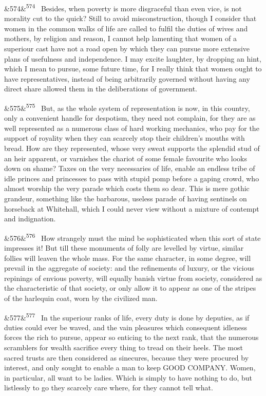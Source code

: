 \documentclass[12pt]{article}
\newcommand{\para}[1][]{\par\noindent\ifx&#1&\else\textsuperscript{\footnotesize #1}~\fi}
\begin{document}
\para[574] Besides, when poverty is more disgraceful than even vice, is not morality cut to the quick? Still to avoid misconstruction, though I consider that women in the common walks of life are called to fulfil the duties of wives and mothers, by religion and reason, I cannot help lamenting that women of a superiour cast have not a road open by which they can pursue more extensive plans of usefulness and independence. I may excite laughter, by dropping an hint, which I mean to pursue, some future time, for I really think that women ought to have representatives, instead of being arbitrarily governed without having any direct share allowed them in the deliberations of government.

\para[575] But, as the whole system of representation is now, in this country, only a convenient handle for despotism, they need not complain, for they are as well represented as a numerous class of hard working mechanics, who pay for the support of royality when they can scarcely stop their children's mouths with bread. How are they represented, whose very sweat supports the splendid stud of an heir apparent, or varnishes the chariot of some female favourite who looks down on shame? Taxes on the very necessaries of life, enable an endless tribe of idle princes and princesses to pass with stupid pomp before a gaping crowd, who almost worship the very parade which costs them so dear. This is mere gothic grandeur, something like the barbarous, useless parade of having sentinels on horseback at Whitehall, which I could never view without a mixture of contempt and indignation.

\para[576] How strangely must the mind be sophisticated when this sort of state impresses it! But till these monuments of folly are levelled by virtue, similar follies will leaven the whole mass. For the same character, in some degree, will prevail in the aggregate of society: and the refinements of luxury, or the vicious repinings of envious poverty, will equally banish virtue from society, considered as the characteristic of that society, or only allow it to appear as one of the stripes of the harlequin coat, worn by the civilized man.

\para[577] In the superiour ranks of life, every duty is done by deputies, as if duties could ever be waved, and the vain pleasures which consequent idleness forces the rich to pursue, appear so enticing to the next rank, that the numerous scramblers for wealth sacrifice every thing to tread on their heels. The most sacred trusts are then considered as sinecures, because they were procured by interest, and only sought to enable a man to keep GOOD COMPANY. Women, in particular, all want to be ladies. Which is simply to have nothing to do, but listlessly to go they scarcely care where, for they cannot tell what.
\end{document}
